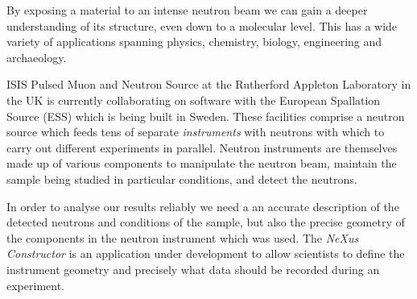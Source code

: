 \iffalse
The NeXus file format arose out of a desire to describe the configurations of neutron, muon, and X-ray experiments in a way that is ``facility-neutral." A shared data format has a number of advantages such as reducing the need for conversion tools and fostering cooperation in software development across different facilities. However, the format is not particularly easy to work with for the uninitiated. This can be especially frustrating to scientists who would much rather get their data and get on with their day. The NeXus Constructor, a tool being developed by software developers based at ISIS Pulsed Muon and Neutron Source in the UK and the European Spallation Source (ESS) in Sweden, attempts to address this problem by providing an interface for users to easily examine and modify the contents of NeXus files.
\fi
By exposing a material to an intense neutron beam we can gain a deeper understanding of its structure, even down to a molecular level. This has a wide variety of applications spanning physics, chemistry, biology, engineering and archaeology.

ISIS Pulsed Muon and Neutron Source at the Rutherford Appleton Laboratory in the UK is currently collaborating on software with the European Spallation Source (ESS) which is being built in Sweden. These facilities comprise a neutron source which feeds tens of separate \textit{instruments} with neutrons with which to carry out different experiments in parallel. Neutron instruments are themselves made up of various components to manipulate the neutron beam, maintain the sample being studied in particular conditions, and detect the neutrons.

In order to analyse our results reliably we need a an accurate description of the detected neutrons and conditions of the sample, but also the precise geometry of the components in the neutron instrument which was used. The \textit{NeXus Constructor} is an application under development to allow scientists to define the instrument geometry and precisely what data should be recorded during an experiment.

